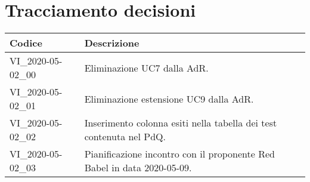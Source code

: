 \section{Tracciamento decisioni}
\renewcommand{\arraystretch}{1.8}

\begin{longtable}{|p{5cm}|p{8cm}|}
	\hline
	
	\rowcolor{header}
	\textbf{Codice} &  \textbf{Descrizione}\\
	
	\hline
	
	VI\_2020-05-02\_00 & Eliminazione UC7 dalla AdR.\\
	VI\_2020-05-02\_01 & Eliminazione estensione UC9 dalla AdR.\\
	VI\_2020-05-02\_02 & Inserimento colonna esiti nella tabella dei test contenuta nel PdQ.\\
	VI\_2020-05-02\_03 & Pianificazione incontro con il proponente Red Babel in data 2020-05-09.\\
	\hline
\end{longtable}